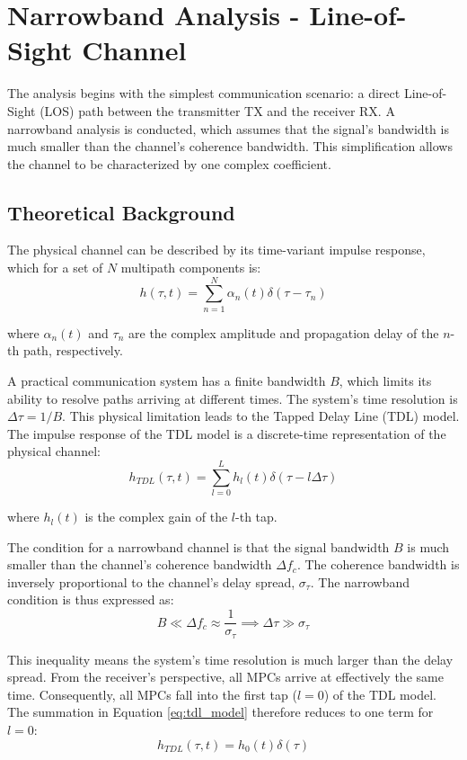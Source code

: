 \chapter{Narrowband Analysis - Line-of-Sight Channel}
\label{chap:los}

The analysis begins with the simplest communication scenario: a direct Line-of-Sight (LOS) path between the transmitter TX and the receiver RX. A narrowband analysis is conducted, which assumes that the signal's bandwidth is much smaller than the channel's coherence bandwidth. This simplification allows the channel to be characterized by one complex coefficient.

\section{Theoretical Background}
The physical channel can be described by its time-variant impulse response, which for a set of $N$ multipath components is:
\begin{equation}
	h(\tau,t) = \sum_{n=1}^{N} \alpha_n(t) \delta(\tau - \tau_n)
\end{equation}

where $\alpha_n(t)$ and $\tau_n$ are the complex amplitude and propagation delay of the $n$-th path, respectively.

A practical communication system has a finite bandwidth $B$, which limits its ability to resolve paths arriving at different times. The system's time resolution is $\Delta\tau = 1/B$. This physical limitation leads to the Tapped Delay Line (TDL) model. The impulse response of the TDL model is a discrete-time representation of the physical channel:
\begin{equation}
	h_{TDL}(\tau, t) = \sum_{l=0}^{L} h_l(t) \delta(\tau - l\Delta\tau)
	\label{eq:tdl_model}
\end{equation}

where $h_l(t)$ is the complex gain of the $l$-th tap.

The condition for a narrowband channel is that the signal bandwidth $B$ is much smaller than the channel's coherence bandwidth $\Delta f_c$. The coherence bandwidth is inversely proportional to the channel's delay spread, $\sigma_\tau$. The narrowband condition is thus expressed as:
\begin{equation}
	B \ll \Delta f_c \approx \frac{1}{\sigma_\tau} \implies \Delta\tau \gg \sigma_\tau
\end{equation}

This inequality means the system's time resolution is much larger than the delay spread. From the receiver's perspective, all MPCs arrive at effectively the same time. Consequently, all MPCs fall into the first tap ($l=0$) of the TDL model. The summation in Equation \ref{eq:tdl_model} therefore reduces to one term for $l=0$:
\begin{equation}
	h_{TDL}(\tau, t) = h_0(t) \delta(\tau)
\end{equation}

